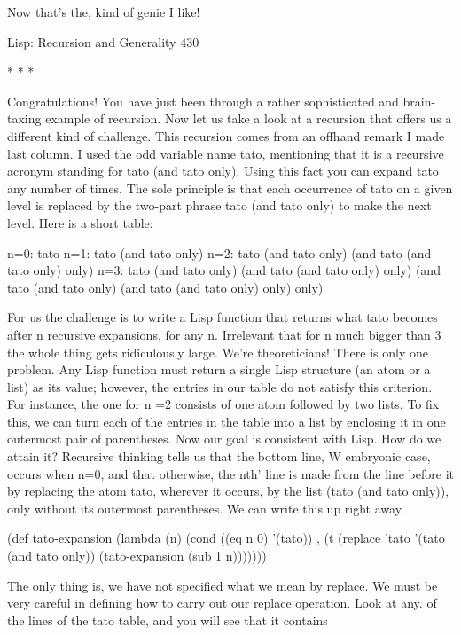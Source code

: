 Now that's the, kind of genie I like!




Lisp: Recursion and Generality                                                       430

                                         *   *   *

        Congratulations! You have just been through a rather sophisticated and brain-
taxing example of recursion. Now let us take a look at a recursion that offers us a
different kind of challenge. This recursion comes from an offhand remark I made last
column. I used the odd variable name tato, mentioning that it is a recursive acronym
standing for tato (and tato only). Using this fact you can expand tato any number of
times. The sole principle is that each occurrence of tato on a given level is replaced by
the two-part phrase tato (and tato only) to make the next level. Here is a short table:

n=0: tato
n=1: tato
       (and tato only)
n=2: tato
       (and tato only)
          (and tato (and tato only) only)
n=3: tato
       (and tato only)
         (and tato (and tato only) only)
           (and tato (and tato only) (and tato (and tato only) only) only)

        For us the challenge is to write a Lisp function that returns what tato becomes
after n recursive expansions, for any n. Irrelevant that for n much bigger than 3 the
whole thing gets ridiculously large. We're theoreticians!
        There is only one problem. Any Lisp function must return a single Lisp
structure (an atom or a list) as its value; however, the entries in our table do not satisfy
this criterion. For instance, the one for n =2 consists of one atom followed by two
lists. To fix this, we can turn each of the entries in the table into a list by enclosing it
in one outermost pair of parentheses. Now our goal is consistent with Lisp. How do
we attain it?
        Recursive thinking tells us that the bottom line, W embryonic case, occurs
when n=0, and that otherwise, the nth' line is made from the line before it by
replacing the atom tato, wherever it occurs, by the list (tato (and tato only)), only
without its outermost parentheses. We can write this up right away.

(def tato-expansion (lambda (n)
  (cond ((eq n 0) '(tato))      ,
        (t (replace 'tato '(tato (and tato only)) (tato-expansion (sub 1 n)))))))

The only thing is, we have not specified what we mean by replace. We must be very
careful in defining how to carry out our replace operation. Look at any. of the lines of
the tato table, and you will see that it contains




